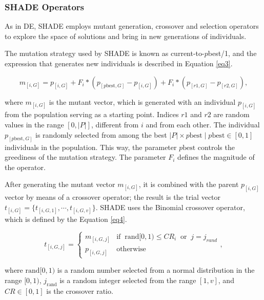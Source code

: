 \subsubsection[\acsfont{SHADE} Operators]{SHADE Operators}

As in \acs{DE}, \acs{SHADE} employs mutant generation, crossover and selection operators to explore the space of solutions and bring in new generations of individuals.

The mutation strategy used by \acs{SHADE} is known as current-to-$p$best/1, and the expression that generates new individuals is described in Equation \eqref{eq3}.

\begin{equation}
m_{[i,G]} = p_{[i,G]} + F_i * (p_{[p\text{best}, G]} - p_{[i,G]}) + F_i * (p_{[r1, G]} - p_{[r2,G]}),
\label{eq3}
\end{equation}

\noindent where $m_{[i,G]}$ is the mutant vector, which is generated with an individual $p_{[i,G]}$ from the population serving as a starting point. Indices $r1$ and $r2$ are random values in the range $[0,|P|]$, different from $i$ and from each other. The individual $p_{[p\text{best}, G]}$ is randomly selected from among the best $|P| \times p\text{best}\;|\;p\text{best}\in [0,1]$ individuals in the population. This way, the parameter $p\text{best}$ controls the greediness of the mutation strategy. The parameter $F_i$ defines the magnitude of the operator.

After generating the mutant vector $m_{[i,G]}$, it is combined with the parent $p_{[i,G]}$ vector by means of a crossover operator; the result is the trial vector $t_{[i,G]} = \{t_{[i,G,1]}, \cdots, t_{[i,G,v]}\}$. \acs{SHADE} uses the Binomial crossover operator, which is defined by the Equation \eqref{eq4}.

\begin{equation}
t_{[i,G,j]} = \left\{ \begin{array}{lc}
m_{[i,G,j]} &   \text{if} \;\; \text{rand}[0,1) \le CR_i \;\; \text{or} \;\;j = j_{rand} \\
p_{[i,G,j]} &  \text{otherwise}
\end{array}
\right.,
\label{eq4}
\end{equation}

\noindent where $\text{rand}[0,1)$ is a random number selected from a normal distribution in the range $[0,1)$, $j_\text{rand}$ is a random integer selected from the range $[1,v]$, and $CR \in [0,1]$ is the crossover ratio.

